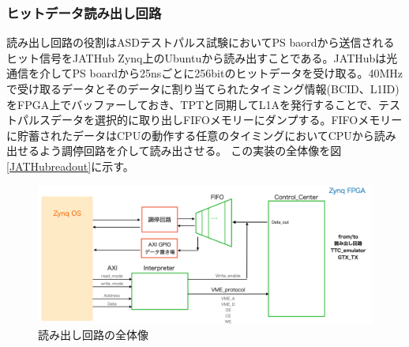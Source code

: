 \subsubsection{ヒットデータ読み出し回路}
\label{subsubsec_DAQ}
読み出し回路の役割はASDテストパルス試験においてPS baordから送信されるヒット信号をJATHub Zynq上のUbuntuから読み出すことである。JATHubは光通信を介してPS boardから25nsごとに256bitのヒットデータを受け取る。40MHzで受け取るデータとそのデータに割り当てられたタイミング情報(BCID、L1ID)をFPGA上でバッファーしておき、TPTと同期してL1Aを発行することで、テストパルスデータを選択的に取り出しFIFOメモリーにダンプする。FIFOメモリーに貯蓄されたデータはCPUの動作する任意のタイミングにおいてCPUから読み出せるよう調停回路を介して読み出させる。
この実装の全体像を図\ref{JATHubreadout}に示す。

\begin{figure} 
\centering
\includegraphics[width=16cm]{fig/QAQC/JAThubreadout.png}
\caption[読み出し回路の全体像]{読み出し回路の全体像}
\label{fig_CTA}
\end{figure}


